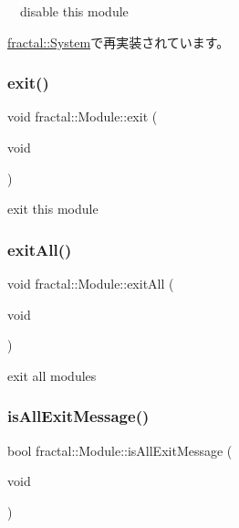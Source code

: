 　disable this module 



\hyperlink{classfractal_1_1System_a446532d4c3811f6005e0c52ad653a997}{fractal\+::\+System}で再実装されています。

\mbox{\label{classfractal_1_1Module_a04ba8c14e82f92c1db411662d7a16cd8}} 
\subsubsection{\texorpdfstring{exit()}{exit()}}
{\footnotesize\ttfamily void fractal\+::\+Module\+::exit (\begin{DoxyParamCaption}\item[{void}]{ }\end{DoxyParamCaption})\hspace{0.3cm}{\ttfamily [inline]}}



exit this module 

\mbox{\label{classfractal_1_1Module_a40cfc2e5ab9829d5decaef0ce30cdbcc}} 
\subsubsection{\texorpdfstring{exit\+All()}{exitAll()}}
{\footnotesize\ttfamily void fractal\+::\+Module\+::exit\+All (\begin{DoxyParamCaption}\item[{void}]{ }\end{DoxyParamCaption})\hspace{0.3cm}{\ttfamily [inline]}}



exit all modules 

\mbox{\label{classfractal_1_1Module_a7766711ae2e854ee7a723781ef1b2572}} 
\subsubsection{\texorpdfstring{is\+All\+Exit\+Message()}{isAllExitMessage()}}
{\footnotesize\ttfamily bool fractal\+::\+Module\+::is\+All\+Exit\+Message (\begin{DoxyParamCaption}\item[{void}]{ }\end{DoxyParamCaption})\hspace{0.3cm}{\ttfamily [inline]}}



